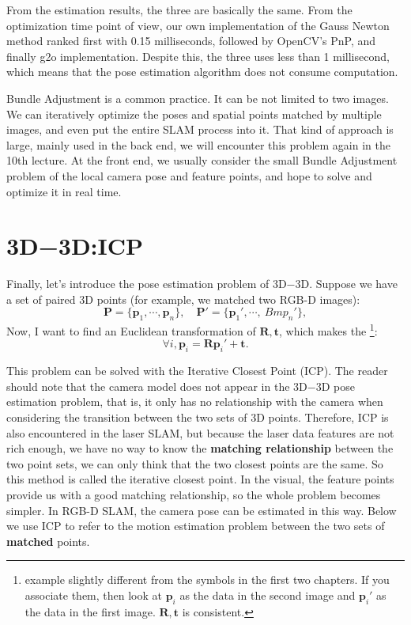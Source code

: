 From the estimation results, the three are basically the same. From the optimization time point of view, our own implementation of the Gauss Newton method ranked first with 0.15 milliseconds, followed by OpenCV's PnP, and finally g2o implementation. Despite this, the three uses less than 1 millisecond, which means that the pose estimation algorithm does not consume computation.

Bundle Adjustment is a common practice. It can be not limited to two images. We can iteratively optimize the poses and spatial points matched by multiple images, and even put the entire SLAM process into it. That kind of approach is large, mainly used in the back end, we will encounter this problem again in the 10th lecture. At the front end, we usually consider the small Bundle Adjustment problem of the local camera pose and feature points, and hope to solve and optimize it in real time.

\section{3D−3D:ICP}
Finally, let's introduce the pose estimation problem of 3D−3D. Suppose we have a set of paired 3D points (for example, we matched two RGB-D images):
\[
\bm{P} = \{ \bm{p}_1, \cdots, \bm{p}_n \}, \quad \bm{P}' = \{ \bm{p}_1', \cdots, \ Bm{p}_n'\},
\]
Now, I want to find an Euclidean transformation of $\bm{R}, \bm{t}$, which makes the \footnote{ example slightly different from the symbols in the first two chapters. If you associate them, then look at $\bm{p}_i$ as the data in the second image and $\bm{p}_i'$ as the data in the first image. $\bm{R}, \bm{t}$ is consistent. }:
\[
\forall i, \bm{p}_i = \bm{R} \bm{p}_i' + \bm{t}.
\]

This problem can be solved with the Iterative Closest Point (ICP). The reader should note that the camera model does not appear in the 3D−3D pose estimation problem, that is, it only has no relationship with the camera when considering the transition between the two sets of 3D points. Therefore, ICP is also encountered in the laser SLAM, but because the laser data features are not rich enough, we have no way to know the \textbf{matching relationship} between the two point sets, we can only think that the two closest points are the same. So this method is called the iterative closest point. In the visual, the feature points provide us with a good matching relationship, so the whole problem becomes simpler. In RGB-D SLAM, the camera pose can be estimated in this way. Below we use ICP to refer to the motion estimation problem between the two sets of \textbf{matched} points.

